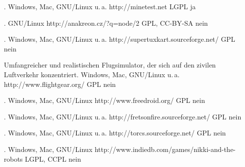 



{.}
{Windows, Mac, GNU/Linux u.\,a.}
{http://minetest.net}
{LGPL}
{ja}

{.}
{GNU/Linux} %
{http://anakreon.cz/?q=node/2}
{GPL, CC-BY-SA}
{nein}

{.}
{Windows, Mac, GNU/Linux u.\,a.}
{http://supertuxkart.sourceforge.net/}
{GPL}
{nein} %


{Umfangreicher und realistischen Flugsimulator, der sich auf den zivilen Luftverkehr konzentriert.}
{Windows, Mac, GNU/Linux u.\,a.}
{http://www.flightgear.org/}
{GPL}
{nein} %


{.}
{Windows, Mac, GNU/Linux}
{http://www.freedroid.org/}
{GPL}
{nein}

{.}
{Windows, Mac, GNU/Linux u.\,a.}
{http://fretsonfire.sourceforge.net/}
{GPL}
{nein} %

{.}
{Windows, Mac, GNU/Linux u.\,a.}
{http://torcs.sourceforge.net/}
{GPL}
{nein} %

{.}
{Windows, Mac, GNU/Linux}
{http://www.indiedb.com/games/nikki-and-the-robots}
{LGPL, CCPL}
{nein}

\backpage


